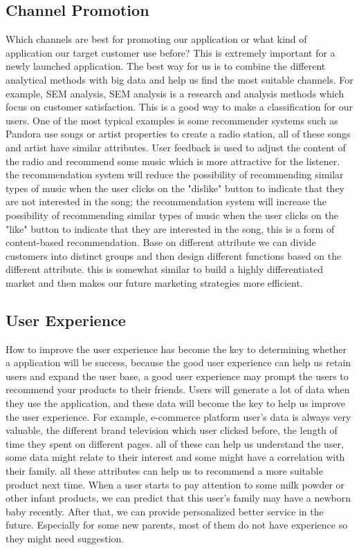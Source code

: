 \documentclass[sigconf]{acmart}
\begin{document}
\subsection{Channel Promotion}
Which channels are best for promoting our application or what kind of application our target customer use before? This is extremely important for a newly launched application. The best way for us is to combine the different analytical methods with big data and help us find the most suitable channels. For example, SEM analysis, SEM analysis is a research and analysis methods which focus on customer satisfaction. This is a good way to make a classification for our users. One of the most typical examples is some recommender systems such as Pandora use songs or artist properties to create a radio station, all of these songs and artist have similar attributes. User feedback is used to adjust the content of the radio and recommend some music which is more attractive for the listener.
the recommendation system will reduce the possibility of recommending similar types of music when the user clicks on the "dislike" button to indicate that they are not interested in the song; the recommendation system will increase the possibility of recommending similar types of music when the user clicks on the "like" button to indicate that they are interested in the song, this is a form of content-based recommendation. Base on different attribute we can divide customers into distinct groups and then design different functions based on the different attribute.  this is somewhat similar to build a highly differentiated market and then makes our future marketing strategies more efficient.

\subsection{User Experience}
How to improve the user experience has become the key to determining whether a application will be success, because the good user experience can help us retain users and expand the user base, a good user experience may prompt the users to recommend your products to their friends. Users will generate a lot of data when they use the application, and these data will become the key to help us improve the user experience. For example, e-commerce platform user's data is always very valuable, the different brand television which user clicked before, the length of time they spent on different pages. all of these can help us understand the user, some data might relate to their interest and some might have a correlation with their family. all these attributes can help us to recommend a more suitable product next time. When a user starts to pay attention to some milk powder or other infant products, we can predict that this user's family may have a newborn baby recently. After that, we can provide personalized better service in the future. Especially for some new parents, most of them do not have experience so they might need suggestion.
\end{document}
